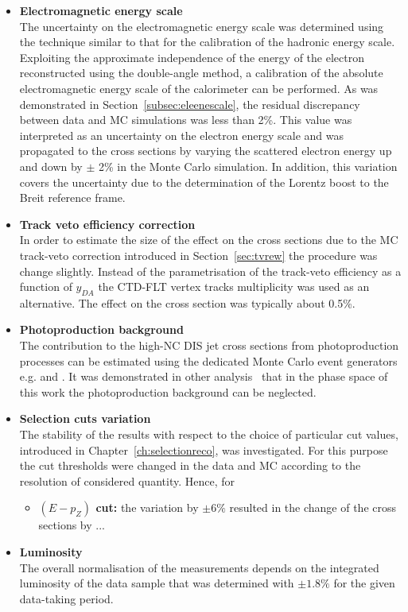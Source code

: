 \begin{itemize}
	\item \textbf{Electromagnetic energy scale}\\
		The uncertainty on the electromagnetic energy scale was determined using the technique similar to that for the calibration of the hadronic energy scale. Exploiting the approximate independence of the energy of the electron reconstructed using the double-angle method, a calibration of the absolute electromagnetic energy scale of the calorimeter can be performed. As was demonstrated in Section~\ref{subsec:eleenescale}, the residual discrepancy between data and MC simulations was less than 2\%. This value was interpreted as an uncertainty on the electron energy scale and was propagated to the cross sections by varying the scattered electron energy up and down by $\pm$ 2\% in the Monte Carlo simulation. In addition, this variation covers the uncertainty due to the determination of the Lorentz boost to the Breit reference frame. 
	
	\item \textbf{Track veto efficiency correction}\\
		In order to estimate the size of the effect on the cross sections due to the MC track-veto correction introduced in Section~\ref{sec:tvrew} the procedure was change slightly. Instead of the parametrisation of the track-veto efficiency as a function of $y_{DA}$ the CTD-FLT vertex tracks multiplicity was used as an alternative. The effect on the cross section was typically about 0.5\%.
	
	\item \textbf{Photoproduction background}\\
		The contribution to the high-\qsq NC DIS jet cross sections from photoproduction processes can be estimated using the dedicated Monte Carlo event generators e.g. \pythia and \herwig. It was demonstrated in other analysis~\cite{federike,trewor} that in the phase space of this work the photoproduction background can be neglected.
	
	\item \textbf{Selection cuts variation} \\
		The stability of the results with respect to the choice of particular cut values, introduced in Chapter~\ref{ch:selectionreco}, was investigated. For this purpose the cut thresholds were changed in the data and MC according to the resolution of considered quantity. Hence, for 
		\begin{itemize}
			\item \textbf{$\left( E-p_Z\right) $ cut:} the variation by $\pm6\%$ resulted in the change of the cross sections by ...
		\end{itemize}
	\item \textbf{Luminosity} \\
		The overall normalisation of the measurements depends on the integrated luminosity of the data sample that was determined with $\pm1.8\%$ for the given data-taking period.
\end{itemize}
